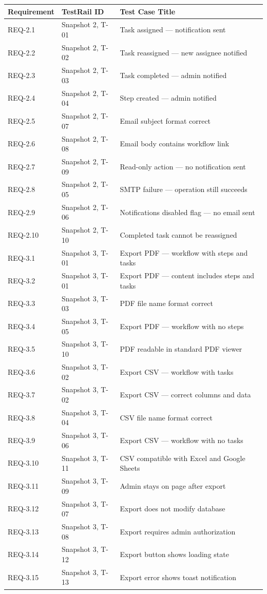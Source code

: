 \documentclass[12pt]{article}
\begin{document}
\begin{center}
\begin{longtable}{lll}
\toprule
Requirement & TestRail ID & Test Case Title \\
\midrule
REQ-2.1 & Snapshot 2, T-01 & Task assigned --- notification sent \\
REQ-2.2 & Snapshot 2, T-02 & Task reassigned --- new assignee notified \\
REQ-2.3 & Snapshot 2, T-03 & Task completed --- admin notified \\
REQ-2.4 & Snapshot 2, T-04 & Step created --- admin notified \\
REQ-2.5 & Snapshot 2, T-07 & Email subject format correct \\
REQ-2.6 & Snapshot 2, T-08 & Email body contains workflow link \\
REQ-2.7 & Snapshot 2, T-09 & Read-only action --- no notification sent \\
REQ-2.8 & Snapshot 2, T-05 & SMTP failure --- operation still succeeds \\
REQ-2.9 & Snapshot 2, T-06 & Notifications disabled flag --- no email sent \\
REQ-2.10 & Snapshot 2, T-10 & Completed task cannot be reassigned \\
REQ-3.1 & Snapshot 3, T-01 & Export PDF --- workflow with steps and tasks \\
REQ-3.2 & Snapshot 3, T-01 & Export PDF --- content includes steps and tasks \\
REQ-3.3 & Snapshot 3, T-03 & PDF file name format correct \\
REQ-3.4 & Snapshot 3, T-05 & Export PDF --- workflow with no steps \\
REQ-3.5 & Snapshot 3, T-10 & PDF readable in standard PDF viewer \\
REQ-3.6 & Snapshot 3, T-02 & Export CSV --- workflow with tasks \\
REQ-3.7 & Snapshot 3, T-02 & Export CSV --- correct columns and data \\
REQ-3.8 & Snapshot 3, T-04 & CSV file name format correct \\
REQ-3.9 & Snapshot 3, T-06 & Export CSV --- workflow with no tasks \\
REQ-3.10 & Snapshot 3, T-11 & CSV compatible with Excel and Google Sheets \\
REQ-3.11 & Snapshot 3, T-09 & Admin stays on page after export \\
REQ-3.12 & Snapshot 3, T-07 & Export does not modify database \\
REQ-3.13 & Snapshot 3, T-08 & Export requires admin authorization \\
REQ-3.14 & Snapshot 3, T-12 & Export button shows loading state \\
REQ-3.15 & Snapshot 3, T-13 & Export error shows toast notification \\
\bottomrule
\end{longtable}
\end{center}
 
\end{document}
